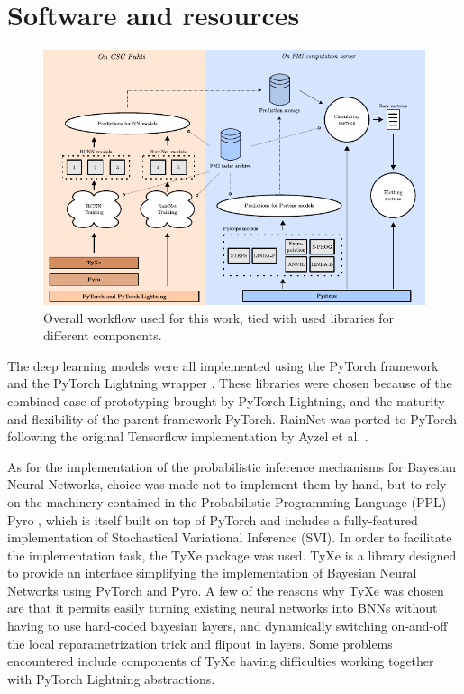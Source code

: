 \section{Software and resources}

\begin{figure}
	\centering
	\label{fig:workflow}
	\includegraphics[width=\textwidth]{images/workflow/workflow}
	\caption{Overall workflow used for this work, tied with used libraries for different components.}
\end{figure}

The deep learning models were all implemented using the PyTorch framework and the PyTorch Lightning wrapper \cite{Falcon_PyTorch_Lightning_2019}. These libraries were chosen because of the combined ease of prototyping brought by PyTorch Lightning, and the maturity and flexibility of the parent framework PyTorch. RainNet was ported to PyTorch following the original Tensorflow implementation by Ayzel et al. \cite{Ayzel2020RainNet}. 

As for the implementation of the probabilistic inference mechanisms for Bayesian Neural Networks, choice was made not to implement them by hand, but to rely on the machinery contained in the Probabilistic Programming Language (PPL) Pyro \cite{bingham2018pyro}, which is itself built on top of PyTorch and includes a fully-featured implementation of Stochastical Variational Inference (SVI). In order to facilitate the implementation task, the TyXe package \cite{ritter2021tyxe} was used. TyXe is a library designed to provide an interface simplifying the implementation of Bayesian Neural Networks using PyTorch and Pyro. A few of the reasons why TyXe was chosen are that it permits easily turning existing neural networks into BNNs without having to use hard-coded bayesian layers, and dynamically switching on-and-off the local reparametrization trick and flipout in layers. Some problems encountered include components of TyXe having difficulties working together with PyTorch Lightning abstractions.

